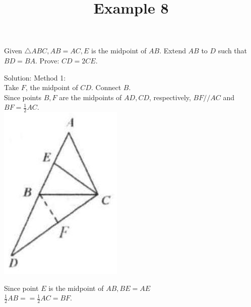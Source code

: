 \documentclass{article}
\title{Example 8}
\date{}
\begin{document}
\maketitle

Given \(\triangle A B C, A B=A C, E\) is the midpoint of \(A B\). Extend \(A B\) to \(D\) such that \(B D=B A\). Prove: \(C D=2 C E\).

Solution:
Method 1:\\
Take \(F\), the midpoint of \(C D\). Connect \(B\).\\
Since points \(B, F\) are the midpoints of \(A D, C D\), respectively, \(B F / / A C\) and \(B F=\frac{1}{2} A C\).\\
\centering
\includegraphics[width=\textwidth]{images/039.jpg}

Since point \(E\) is the midpoint of \(A B, B E=A E\)\\
\(\frac{1}{2} A B==\frac{1}{2} A C=B F\).
\end{document}
